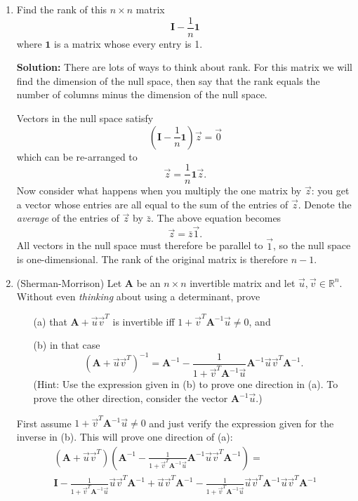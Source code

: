 \documentclass[11pt,fleqn]{article}
\newcommand{\mat}[1]{\mathbf{#1}}
\begin{document}
\begin{enumerate}
\item Find the rank of this $n\times n$ matrix
\[\mathbf{I} - \frac{1}{n}\mathbf{1}\]
where $\mathbf{1}$ is a matrix whose every entry is 1. 

{\bf Solution:} There are lots of ways to think about rank. For this matrix we will find the dimension of the null space, then say that the rank equals the number of columns minus the dimension of the null space.

Vectors in the null space satisfy
\[\left(\mathbf{I} - \frac{1}{n}\mathbf{1}\right)\vec{z} = \vec{0}\]
which can be re-arranged to
\[\vec{z} = \frac{1}{n}\mathbf{1}\vec{z}.\]
Now consider what happens when you multiply the one matrix by $\vec{z}$: you get a vector whose entries are all equal to the sum of the entries of $\vec{z}$.
Denote the {\it average} of the entries of $\vec{z}$ by $\bar{z}$.
The above equation becomes
\[\vec{z} = \bar{z}\vec{1}.\]
All vectors in the null space must therefore be parallel to $\vec{1}$, so the null space is one-dimensional.
The rank of the original matrix is therefore $n-1$.
\item (Sherman-Morrison) Let $\mathbf{A}$ be an $n\times n$ invertible matrix and let $\vec{u},\vec{v}\in\mathbb{R}^n$. Without even {\it thinking} about using a determinant, prove
	\begin{itemize}
	\item[(a)] that $\mathbf{A}+\vec{u}\vec{v}^T$ is invertible iff $1+\vec{v}^T\mathbf{A}^{-1}\vec{u}\neq0$, and
	\item[(b)] in that case
	\[\left(\mathbf{A}+\vec{u}\vec{v}^T\right)^{-1} = \mat{A}^{-1} - \frac{1}{1+\vec{v}^T\mathbf{A}^{-1}\vec{u}}\mat{A}^{-1}\vec{u}\vec{v}^T\mat{A}^{-1}.\]
	(Hint: Use the expression given in (b) to prove one direction in (a). To prove the other direction, consider the vector $\mathbf{A}^{-1}\vec{u}$.)
	\end{itemize}
 First assume $1+\vec{v}^T\mathbf{A}^{-1}\vec{u}\neq 0$ and just verify the expression given for the inverse in (b). This will prove one direction of (a):
\begin{multline*}
\left(\mathbf{A}+\vec{u}\vec{v}^T\right)\left(\mat{A}^{-1} - \frac{1}{1+\vec{v}^T\mathbf{A}^{-1}\vec{u}}\mat{A}^{-1}\vec{u}\vec{v}^T\mat{A}^{-1}\right) =\\ \mat{I} - \frac{1}{1 + \vec{v}^T\mathbf{A}^{-1}\vec{u}}\vec{u}\vec{v}^T\mat{A}^{-1} + \vec{u}\vec{v}^T\mathbf{A}^{-1} - \frac{1}{1+\vec{v}^T\mathbf{A}^{-1}\vec{u}}\vec{u}\vec{v}^T\mat{A}^{-1}\vec{u}\vec{v}^T\mat{A}^{-1}
\end{multline*}

\end{enumerate}
\end{document}
